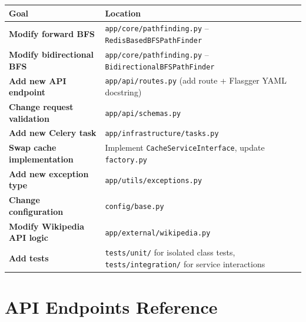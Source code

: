 \documentclass[11pt,a4paper]{article}
\begin{document}
\begin{tabularx}{\textwidth}{@{}>{\bfseries}l X@{}}
\toprule
Goal & Location \\
\midrule
Modify forward BFS & \texttt{app/core/pathfinding.py} -- \texttt{RedisBasedBFSPathFinder} \\
Modify bidirectional BFS & \texttt{app/core/pathfinding.py} -- \texttt{BidirectionalBFSPathFinder} \\
Add new API endpoint & \texttt{app/api/routes.py} (add route + Flasgger YAML docstring) \\
Change request validation & \texttt{app/api/schemas.py} \\
Add new Celery task & \texttt{app/infrastructure/tasks.py} \\
Swap cache implementation & Implement \texttt{CacheServiceInterface}, update \texttt{factory.py} \\
Add new exception type & \texttt{app/utils/exceptions.py} \\
Change configuration & \texttt{config/base.py} \\
Modify Wikipedia API logic & \texttt{app/external/wikipedia.py} \\
Add tests & \texttt{tests/unit/} for isolated class tests, \texttt{tests/integration/} for service interactions \\
\bottomrule
\end{tabularx}

\section{API Endpoints Reference}
\end{document}
